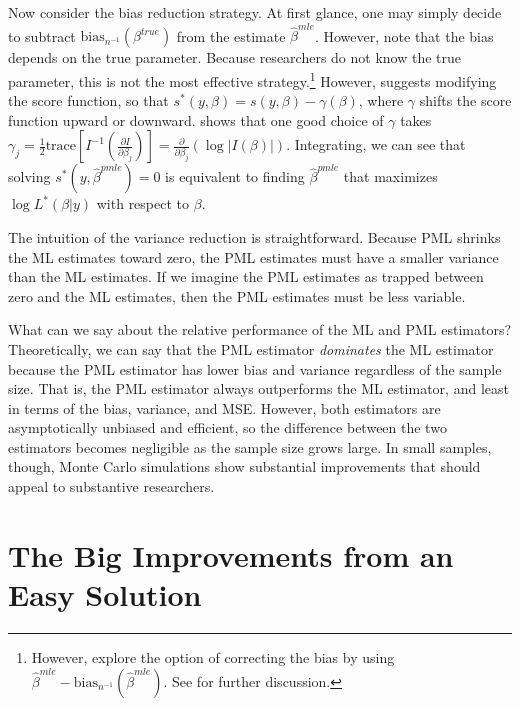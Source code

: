 \documentclass[12pt]{article}
\begin{document}
Now consider the bias reduction strategy. 
At first glance, one may simply decide to subtract $\text{bias}_{n^{-1}}(\beta^{true})$ from the estimate $\hat{\beta}^{mle}$. 
However, note that the bias depends on the true parameter. 
Because researchers do not know the true parameter, this is not the most effective strategy.\footnote{However, \cite{AndersonRichardson1979} explore the option of correcting the bias by using  $\hat{\beta}^{mle} - \text{bias}_{n^{-1}}(\hat{\beta}^{mle})$. See \citet[esp. p. 190]{Kosmidis2014} for further discussion.}
However, \cite{Firth1993} suggests modifying the score function, so that $s^*(y, \beta) = s(y, \beta) - \gamma(\beta)$, where $\gamma$ shifts the score function upward or downward.
\cite{Firth1993} shows that one good choice of $\gamma$ takes $\gamma_j = \frac{1}{2} \text{trace} \left[ I^{-1} \left( \frac{\partial I}{\partial \beta_j}\right)\right] = \frac{\partial}{\partial \beta_j} \left( \log | I(\beta) | \right)$.
Integrating, we can see that solving $s^*(y, \hat{\beta}^{pmle}) = 0$ is equivalent to finding $\hat{\beta}^{pmle}$ that maximizes $\log L^*(\beta | y)$ with respect to $\beta$.

The intuition of the variance reduction is straightforward. Because PML shrinks the ML estimates toward zero, the PML estimates must have a smaller variance than the ML estimates. If we imagine the PML estimates as trapped between zero and the ML estimates, then the PML estimates must be less variable.

What can we say about the relative performance of the ML and PML estimators? 
Theoretically, we can say that the PML estimator \textit{dominates} the ML estimator because the PML estimator has lower bias and variance regardless of the sample size. That is, the PML estimator always outperforms the ML estimator, and least in terms of the bias, variance, and MSE.
However, both estimators are asymptotically unbiased and efficient, so the difference between the two estimators becomes negligible as the sample size grows large.
In small samples, though, Monte Carlo simulations show substantial improvements that should appeal to substantive researchers.

\section*{The Big Improvements from an Easy Solution}
\end{document}
